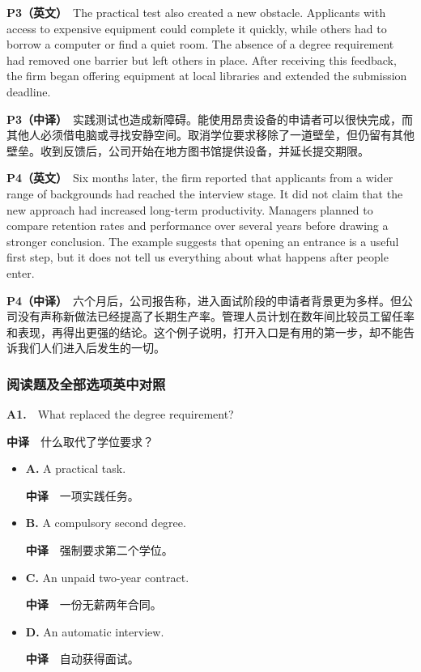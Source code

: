 \documentclass[
  11pt,
]{ctexart}
\begin{document}
\textbf{P3（英文）}　The practical test also created a new obstacle.
Applicants with access to expensive equipment could complete it quickly,
while others had to borrow a computer or find a quiet room. The absence
of a degree requirement had removed one barrier but left others in
place. After receiving this feedback, the firm began offering equipment
at local libraries and extended the submission deadline.

\textbf{P3（中译）}　实践测试也造成新障碍。能使用昂贵设备的申请者可以很快完成，而其他人必须借电脑或寻找安静空间。取消学位要求移除了一道壁垒，但仍留有其他壁垒。收到反馈后，公司开始在地方图书馆提供设备，并延长提交期限。

\textbf{P4（英文）}　Six months later, the firm reported that applicants
from a wider range of backgrounds had reached the interview stage. It
did not claim that the new approach had increased long-term
productivity. Managers planned to compare retention rates and
performance over several years before drawing a stronger conclusion. The
example suggests that opening an entrance is a useful first step, but it
does not tell us everything about what happens after people enter.

\textbf{P4（中译）}　六个月后，公司报告称，进入面试阶段的申请者背景更为多样。但公司没有声称新做法已经提高了长期生产率。管理人员计划在数年间比较员工留任率和表现，再得出更强的结论。这个例子说明，打开入口是有用的第一步，却不能告诉我们人们进入后发生的一切。

\subsubsection{阅读题及全部选项英中对照}\label{ux9605ux8bfbux9898ux53caux5168ux90e8ux9009ux9879ux82f1ux4e2dux5bf9ux7167}

\textbf{A1.}　What replaced the degree requirement?

\textbf{中译}　什么取代了学位要求？

\begin{itemize}
\item
  \textbf{A.} A practical task.

  \textbf{中译}　一项实践任务。
\item
  \textbf{B.} A compulsory second degree.

  \textbf{中译}　强制要求第二个学位。
\item
  \textbf{C.} An unpaid two-year contract.

  \textbf{中译}　一份无薪两年合同。
\item
  \textbf{D.} An automatic interview.

  \textbf{中译}　自动获得面试。
\end{itemize}
\end{document}
